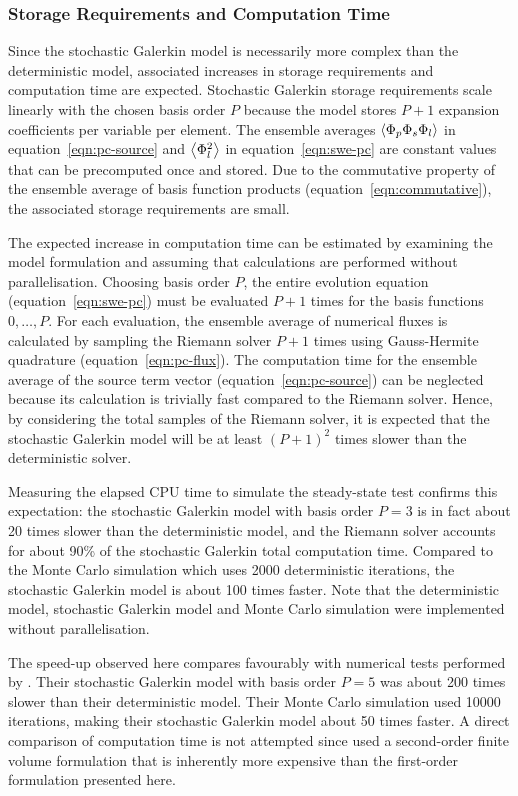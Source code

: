 \subsubsection{Storage Requirements and Computation Time}

Since the stochastic Galerkin model is necessarily more complex than the deterministic model, associated increases in storage requirements and computation time are expected.
Stochastic Galerkin storage requirements scale linearly with the chosen basis order $P$ because the model stores $P+1$ expansion coefficients per variable per element.
The ensemble averages $\left\langle \Phi_p \Phi_s \Phi_l \right\rangle$ in equation~\eqref{eqn:pc-source} and $\left\langle \Phi_l^2 \right\rangle$ in equation~\eqref{eqn:swe-pc} are constant values that can be precomputed once and stored.
Due to the commutative property of the ensemble average of basis function products (equation~\ref{eqn:commutative}), the associated storage requirements are small.

The expected increase in computation time can be estimated by examining the model formulation and assuming that calculations are performed without parallelisation.
Choosing basis order $P$, the entire evolution equation (equation~\ref{eqn:swe-pc}) must be evaluated $P+1$ times for the basis functions $0, \ldots, P$.
For each evaluation, the ensemble average of numerical fluxes is calculated by sampling the Riemann solver $P+1$ times using Gauss-Hermite quadrature (equation~\ref{eqn:pc-flux}).
The computation time for the ensemble average of the source term vector (equation~\ref{eqn:pc-source}) can be neglected because its calculation is trivially fast compared to the Riemann solver. 
Hence, by considering the total samples of the Riemann solver, it is expected that the stochastic Galerkin model will be at least $\left(P+1\right)^2$ times slower than the deterministic solver.

Measuring the elapsed CPU time to simulate the steady-state test confirms this expectation: the stochastic Galerkin model with basis order $P=3$ is in fact about 20 times slower than the deterministic model, and the Riemann solver accounts for about 90\% of the stochastic Galerkin total computation time.
Compared to the Monte Carlo simulation which uses \num{2000} deterministic iterations, the stochastic Galerkin model is about 100 times faster.
Note that the deterministic model, stochastic Galerkin model and Monte Carlo simulation were implemented without parallelisation.

The speed-up observed here compares favourably with numerical tests performed by \citet{ge2008}.
Their stochastic Galerkin model with basis order $P=5$ was about 200 times slower than their deterministic model.
Their Monte Carlo simulation used \num{10000} iterations, making their stochastic Galerkin model about 50 times faster.
A direct comparison of computation time is not attempted since \citet{ge2008} used a second-order finite volume formulation that is inherently more expensive than the first-order formulation presented here.

